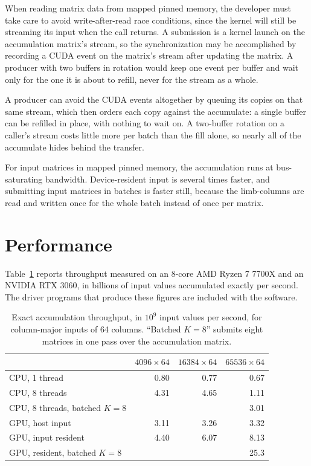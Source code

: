 \documentclass[acmsmall,screen,review]{acmart}
\begin{document}
When reading matrix data from mapped pinned memory, the developer must take care to avoid write-after-read race conditions, since the kernel will still be streaming its input when the call returns. A submission is a kernel launch on the accumulation matrix's stream, so the synchronization may be accomplished by recording a CUDA event on the matrix's stream after updating the matrix. A producer with two buffers in rotation would keep one event per buffer and wait only for the one it is about to refill, never for the stream as a whole.

A producer can avoid the CUDA events altogether by queuing its copies on that same stream, which then orders each copy against the accumulate: a single buffer can be refilled in place, with nothing to wait on. A two-buffer rotation on a caller's stream costs little more per batch than the fill alone, so nearly all of the accumulate hides behind the transfer.

For input matrices in mapped pinned memory, the accumulation runs at bus-saturating bandwidth. Device-resident input is several times faster, and submitting input matrices in batches is faster still, because the limb-columns are read and written once for the whole batch instead of once per matrix.

\section{Performance}

Table~\ref{tab:throughput} reports throughput measured on an 8-core AMD Ryzen 7 7700X and an NVIDIA RTX 3060, in billions of input values accumulated exactly per second. The driver programs that produce these figures are included with the software.

\begin{table}[t]
\caption{Exact accumulation throughput, in $10^9$ input values per second, for column-major inputs of 64 columns. ``Batched $K=8$'' submits eight matrices in one pass over the accumulation matrix.}
\label{tab:throughput}
\begin{tabular}{lrrr}
\toprule
 & $4096 \times 64$ & $16384 \times 64$ & $65536 \times 64$ \\
\midrule
CPU, 1 thread & 0.80 & 0.77 & 0.67 \\
CPU, 8 threads & 4.31 & 4.65 & 1.11 \\
CPU, 8 threads, batched $K=8$ & & & 3.01 \\
GPU, host input & 3.11 & 3.26 & 3.32 \\
GPU, input resident & 4.40 & 6.07 & 8.13 \\
GPU, resident, batched $K=8$ & & & 25.3 \\
\bottomrule
\end{tabular}
\end{table}
\end{document}
